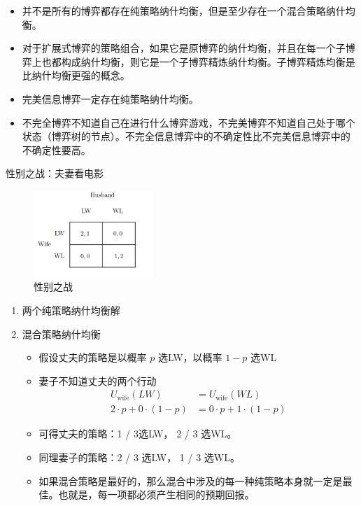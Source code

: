\begin{remark}
\begin{itemize}
\begin{figure}[htbp]
        \end{figure}
        \item 并不是所有的博弈都存在纯策略纳什均衡，但是至少存在一个混合策略纳什均衡。
        \item 对于扩展式博弈的策略组合，如果它是原博弈的纳什均衡，并且在每一个子博弈上也都构成纳什均衡，则它是一个子博弈精炼纳什均衡。子博弈精炼均衡是比纳什均衡更强的概念。
        \item 完美信息博弈一定存在纯策略纳什均衡。
        \item 不完全博弈不知道自己在进行什么博弈游戏，不完美博弈不知道自己处于哪个状态（博弈树的节点）。不完全信息博弈中的不确定性比不完美信息博弈中的不确定性要高。
    \end{itemize}
\end{remark}

\begin{remark}
    性别之战：夫妻看电影
    \begin{figure}[htbp]
        \centering
        \includegraphics[width=0.4\textwidth]{./figure/fig7.png}
        \caption{性别之战}
    \end{figure}
    \begin{enumerate}
        \item 两个纯策略纳什均衡解
        \item 混合策略纳什均衡\begin{itemize}
            \item 假设丈夫的策略是以概率 $p$ 选LW，以概率 $1-p$ 选WL
            \item 妻子不知道丈夫的两个行动 \begin{align*}
                U_{\text{wife}}(LW) &= U_{\text{wife}}(WL)\\
                2\cdot p + 0 \cdot (1 - p) &= 0 \cdot p + 1 \cdot (1 - p)
            \end{align*}
            \item 可得丈夫的策略：1 / 3选LW， 2 / 3 选WL。
            \item 同理妻子的策略：2 / 3 选LW， 1 / 3 选WL。
            \item 如果混合策略是最好的，那么混合中涉及的每一种纯策略本身就一定是最佳。也就是，每一项都必须产生相同的预期回报。
        \end{itemize}
    \end{enumerate}
\end{remark}

